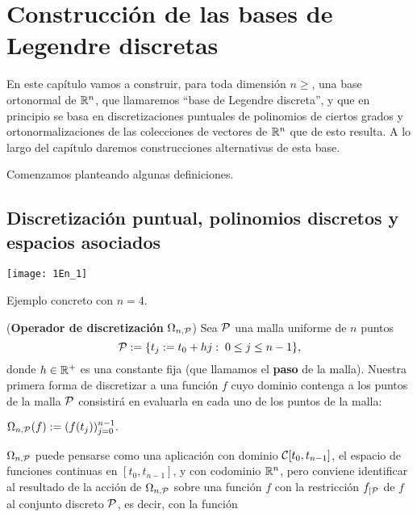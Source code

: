 \chapter{Construcción de las bases de Legendre discretas}
\label{cap 2}

En este capítulo vamos a construir,
para toda dimensión $n\geq $,
una base ortonormal de $\mathbb{R}^{n}$,
que llamaremos ``base de Legendre discreta'',
y que en principio se basa en discretizaciones puntuales
de polinomios de ciertos grados
y ortonormalizaciones de las colecciones
de vectores de $\mathbb{R}^{n}$ que de esto resulta. 
A lo largo del capítulo 
daremos construcciones alternativas de esta base.

Comenzamos planteando algunas definiciones.

\section{Discretización puntual, polinomios discretos y espacios asociados}
\label{discretizacion puntual, polinomios discretos y espacios asociados}

\begin{marginfigure}
\texttt{[image: 1En\_1]} 
		\caption{Ejemplo concreto con $n=4$.}
\end{marginfigure}


\begin{defi}
\label{def: operador de discretizacion puntual}
(\textbf{Operador de discretización} $\Omega_{n,\mathcal{P}}$)
Sea $\mathcal{P}$ una malla uniforme 
de $n$ puntos
\[
\mathcal{P}:=\{ t_{j}:=t_{0}+hj : \hspace{0.1cm} 0 \leq j \leq n-1 \},
\]
donde $h \in \mathbb{R}^{+}$ es una constante fija
(que llamamos el \textbf{paso} de la malla).
Nuestra primera forma de discretizar
a una función $f$ cuyo dominio contenga a los puntos
de la malla $\mathcal{P}$
consistirá en evaluarla en cada uno de los
puntos de la malla:

\begin{center}
$\Omega_{n,\mathcal{P}}(f) := (f(t_{j}))_{j=0}^{n-1}.$
\end{center}
\end{defi}


\noindent $\Omega_{n,\mathcal{P}}$
puede pensarse como una aplicación con dominio
$\mathcal{C}[t_{0}, t_{n-1}]$,
el espacio de funciones 
continuas en $[t_{0}, t_{n-1}]$,
y con codominio $\mathbb{R}^{n}$, pero conviene 
identificar al resultado 
de la acción de $\Omega_{n,\mathcal{P}}$ sobre una
función $f$ con la restricción $f_{| \mathcal{P}}$
de 
$f$ al conjunto discreto $\mathcal{P}$,
es decir, con la función

